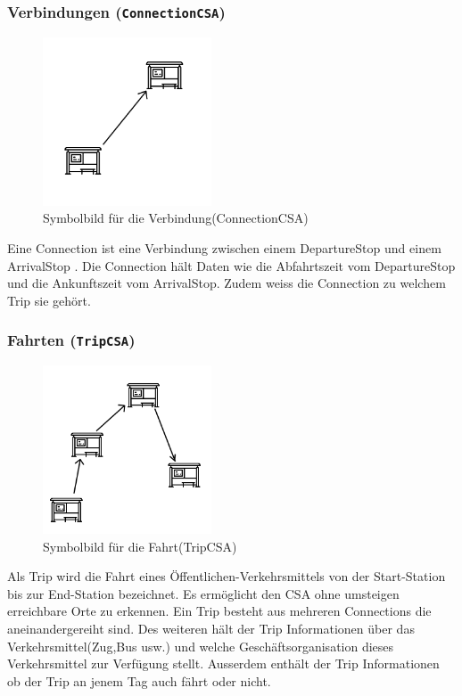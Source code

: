 \subsubsection{Verbindungen (\texttt{ConnectionCSA})}
\begin{figure}[htb]
	\centering
	\includegraphics[width=5cm]{img/connection.png}
	\caption{Symbolbild für die Verbindung(ConnectionCSA)}
	\label{fig:connection}
\end{figure}
Eine Connection ist eine Verbindung zwischen einem DepartureStop und einem ArrivalStop . Die Connection hält Daten wie die Abfahrtszeit vom DepartureStop und die Ankunftszeit vom ArrivalStop. Zudem weiss die Connection zu welchem Trip sie gehört. 

\subsubsection{Fahrten (\texttt{TripCSA})}
\begin{figure}[htb]
	\centering
	\includegraphics[width=5cm]{img/trip.png}
	\caption{Symbolbild für die Fahrt(TripCSA)}
	\label{fig:trip}
\end{figure}
Als Trip wird die Fahrt eines Öffentlichen-Verkehrsmittels von der Start-Station bis zur End-Station bezeichnet. Es ermöglicht den CSA ohne umsteigen erreichbare Orte zu erkennen. Ein Trip besteht aus mehreren Connections die aneinandergereiht sind. Des weiteren hält der Trip Informationen über das Verkehrsmittel(Zug,Bus usw.) und welche Geschäftsorganisation dieses Verkehrsmittel zur Verfügung stellt. Ausserdem enthält der Trip Informationen ob der Trip an jenem Tag auch fährt oder nicht.

